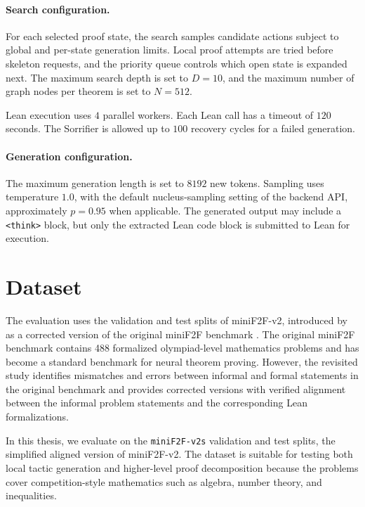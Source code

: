 \documentclass[en]{uet_awesome_thesis/uet-awesome-thesis}
\begin{document}
\paragraph{Search configuration.}
For each selected proof state, the search samples candidate actions subject to global and per-state
generation limits. Local proof attempts are tried before skeleton requests, and the priority queue controls
which open state is expanded next. The maximum search depth is set to \(D=10\), and the maximum
number of graph nodes per theorem is set to \(N=512\).

Lean execution uses \(4\) parallel workers. Each Lean call has a timeout of \(120\) seconds. The
Sorrifier is allowed up to \(100\) recovery cycles for a failed generation.

\paragraph{Generation configuration.}
The maximum generation length is set to \(8192\) new tokens. Sampling uses temperature \(1.0\), with
the default nucleus-sampling setting of the backend API, approximately \(p=0.95\) when applicable.
The generated output may include a \texttt{<think>} block, but only the extracted Lean code block is
submitted to Lean for execution.

\section{Dataset}

The evaluation uses the validation and test splits of miniF2F-v2, introduced by
\citet{ospanov2025minif2fLeanRevisited} as a corrected version of the original miniF2F benchmark
\citep{zheng2021minif2f}. The original miniF2F benchmark contains 488 formalized olympiad-level
mathematics problems and has become a standard benchmark for neural theorem proving. However,
the revisited study identifies mismatches and errors between informal and formal statements in the
original benchmark and provides corrected versions with verified alignment between the informal
problem statements and the corresponding Lean formalizations.

In this thesis, we evaluate on the \texttt{miniF2F-v2s} validation and test splits, the simplified aligned version of miniF2F-v2. The dataset is suitable for
testing both local tactic generation and higher-level proof decomposition because the problems cover
competition-style mathematics such as algebra, number theory, and inequalities.
\end{document}

